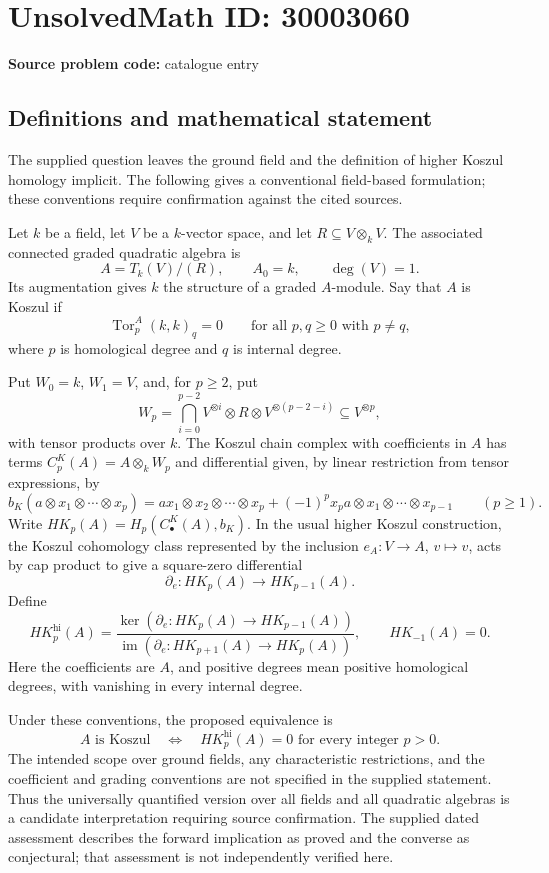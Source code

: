 \documentclass[11pt]{article}
\begin{document}
\section*{UnsolvedMath ID: 30003060}
\textbf{Source problem code:} catalogue entry
\subsection{Definitions and mathematical statement}
The supplied question leaves the ground field and the definition of higher Koszul homology implicit. The following gives a conventional field-based formulation; these conventions require confirmation against the cited sources.

Let \(k\) be a field, let \(V\) be a \(k\)-vector space, and let \(R\subseteq V\otimes_k V\). The associated connected graded quadratic algebra is
\[
A=T_k(V)/(R),\qquad A_0=k,\qquad \deg(V)=1.
\]
Its augmentation gives \(k\) the structure of a graded \(A\)-module. Say that \(A\) is Koszul if
\[
\operatorname{Tor}^{A}_p(k,k)_q=0\qquad\text{for all }p,q\geq0\text{ with }p\ne q,
\]
where \(p\) is homological degree and \(q\) is internal degree.

Put \(W_0=k\), \(W_1=V\), and, for \(p\geq2\), put
\[
W_p=\bigcap_{i=0}^{p-2}V^{\otimes i}\otimes R\otimes V^{\otimes(p-2-i)}\subseteq V^{\otimes p},
\]
with tensor products over \(k\). The Koszul chain complex with coefficients in \(A\) has terms \(C_p^K(A)=A\otimes_k W_p\) and differential given, by linear restriction from tensor expressions, by
\[
b_K(a\otimes x_1\otimes\cdots\otimes x_p)
=ax_1\otimes x_2\otimes\cdots\otimes x_p
+(-1)^p x_pa\otimes x_1\otimes\cdots\otimes x_{p-1}
\qquad(p\geq1).
\]
Write \(HK_p(A)=H_p(C_\bullet^K(A),b_K)\). In the usual higher Koszul construction, the Koszul cohomology class represented by the inclusion \(e_A:V\longrightarrow A\), \(v\longmapsto v\), acts by cap product to give a square-zero differential
\[
\partial_e:HK_p(A)\longrightarrow HK_{p-1}(A).
\]
Define
\[
HK_p^{\mathrm{hi}}(A)=
\frac{\ker(\partial_e:HK_p(A)\to HK_{p-1}(A))}
{\operatorname{im}(\partial_e:HK_{p+1}(A)\to HK_p(A))},
\qquad HK_{-1}(A)=0.
\]
Here the coefficients are \(A\), and positive degrees mean positive homological degrees, with vanishing in every internal degree.

Under these conventions, the proposed equivalence is
\[
A\text{ is Koszul}
\quad\Longleftrightarrow\quad
HK_p^{\mathrm{hi}}(A)=0\text{ for every integer }p>0.
\]
The intended scope over ground fields, any characteristic restrictions, and the coefficient and grading conventions are not specified in the supplied statement. Thus the universally quantified version over all fields and all quadratic algebras is a candidate interpretation requiring source confirmation. The supplied dated assessment describes the forward implication as proved and the converse as conjectural; that assessment is not independently verified here.
\end{document}
